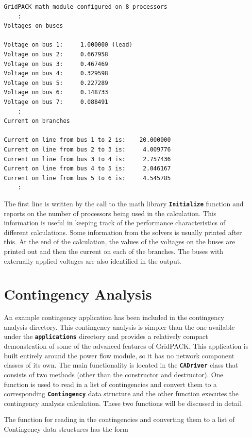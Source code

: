 \documentclass[12pt]{report} %
\begin{document}
{
\color{red}
\begin{Verbatim}[fontseries=b]
GridPACK math module configured on 8 processors
    :
Voltages on buses

Voltage on bus 1:     1.000000 (lead)
Voltage on bus 2:     0.667958
Voltage on bus 3:     0.467469
Voltage on bus 4:     0.329598
Voltage on bus 5:     0.227289
Voltage on bus 6:     0.148733
Voltage on bus 7:     0.088491
    :
Current on branches

Current on line from bus 1 to 2 is:    20.000000
Current on line from bus 2 to 3 is:     4.009776
Current on line from bus 3 to 4 is:     2.757436
Current on line from bus 4 to 5 is:     2.046167
Current on line from bus 5 to 6 is:     4.545785
    :
\end{Verbatim}
}

The first line is written by the call to the math library \texttt{\textbf{Initialize}} function and reports on the number of processors being used in the calculation. This information is useful in keeping track of the performance characteristics of different calculations. Some information from the solvers is usually printed after this. At the end of the calculation, the values of the voltages on the buses are printed out and then the current on each of the branches. The buses with externally applied voltages are also identified in the output.

\section{Contingency Analysis}

An example contingency application has been included in the contingency analysis directory. This contingency analysis is simpler than the one available under the \texttt{\textbf{applications}} directory and provides a relatively compact demonstration of some of the advanced features of GridPACK. This application is built entirely around the power flow module, so it has no network component classes of its own. The main functionality is located in the \texttt{\textbf{CADriver}} class that consists of two methods (other than the constructor and destructor). One function is used to read in a list of contingencies and convert them to a corresponding \texttt{\textbf{Contingency}} data structure and the other function executes the contingency analysis calculation. These two functions will be discussed in detail.

The function for reading in the contingencies and converting them to a list of Contingency data structures has the form
\end{document}
